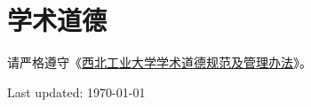 \documentclass[letterpaper]{article}
\def\footerlink{}
\begin{document}
\section*{\textsc{学术道德}}
\quad\quad 请严格遵守《\href{https://renshi.nwpu.edu.cn/info/1441/4824.htm}{西北工业大学学术道德规范及管理办法}》。\par


\begin{center}
  \begin{footnotesize}
    Last updated: \today \\
  \end{footnotesize}
\end{center}
\end{document}
